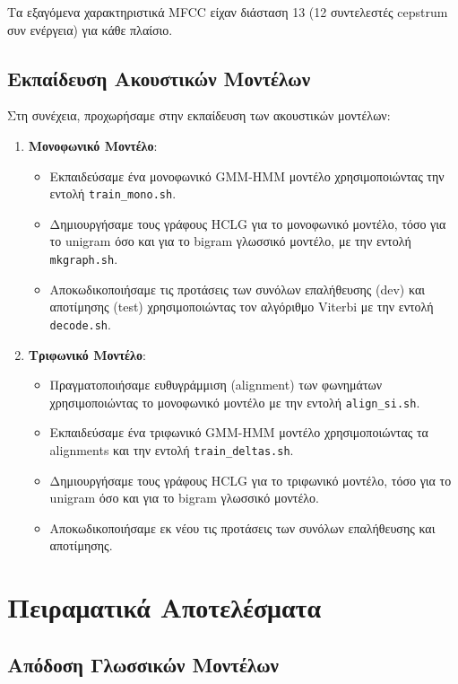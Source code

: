 \documentclass[a4paper,12pt]{article}
\begin{document}
Τα εξαγόμενα χαρακτηριστικά MFCC είχαν διάσταση 13 (12 συντελεστές cepstrum συν ενέργεια) για κάθε πλαίσιο.

\subsection{Εκπαίδευση Ακουστικών Μοντέλων}

Στη συνέχεια, προχωρήσαμε στην εκπαίδευση των ακουστικών μοντέλων:

\begin{enumerate}
    \item \textbf{Μονοφωνικό Μοντέλο}:
    \begin{itemize}
        \item Εκπαιδεύσαμε ένα μονοφωνικό GMM-HMM μοντέλο χρησιμοποιώντας την εντολή \texttt{train\_mono.sh}.
        \item Δημιουργήσαμε τους γράφους HCLG για το μονοφωνικό μοντέλο, τόσο για το unigram όσο και για το bigram γλωσσικό μοντέλο, με την εντολή \texttt{mkgraph.sh}.
        \item Αποκωδικοποιήσαμε τις προτάσεις των συνόλων επαλήθευσης (dev) και αποτίμησης (test) χρησιμοποιώντας τον αλγόριθμο Viterbi με την εντολή \texttt{decode.sh}.
    \end{itemize}
    
    \item \textbf{Τριφωνικό Μοντέλο}:
    \begin{itemize}
        \item Πραγματοποιήσαμε ευθυγράμμιση (alignment) των φωνημάτων χρησιμοποιώντας το μονοφωνικό μοντέλο με την εντολή \texttt{align\_si.sh}.
        \item Εκπαιδεύσαμε ένα τριφωνικό GMM-HMM μοντέλο χρησιμοποιώντας τα alignments και την εντολή \texttt{train\_deltas.sh}.
        \item Δημιουργήσαμε τους γράφους HCLG για το τριφωνικό μοντέλο, τόσο για το unigram όσο και για το bigram γλωσσικό μοντέλο.
        \item Αποκωδικοποιήσαμε εκ νέου τις προτάσεις των συνόλων επαλήθευσης και αποτίμησης.
    \end{itemize}
\end{enumerate}

\section{Πειραματικά Αποτελέσματα}

\subsection{Απόδοση Γλωσσικών Μοντέλων}
\end{document}

